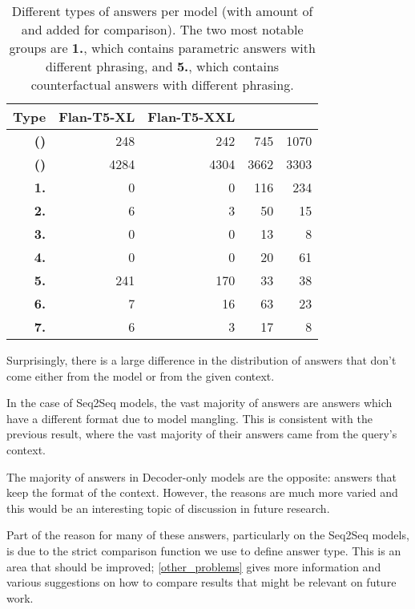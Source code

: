 \begin{table}[ht]
	\centering
	\footnotesize
	\begin{tabular}{>{\bfseries}r | r r r r}
		\toprule
			\bfseries Type & \ttfamily\scriptsize Flan-T5-XL & \ttfamily\scriptsize Flan-T5-XXL & \ttfamily\scriptsize \llamaparbox{} & \ttfamily\scriptsize \bigllamaparbox{} \\
		\midrule
			\tiny (\Parametric{}) & 248 & 242 & 745 & 1070 \\
			\tiny (\Contextual{}) & 4284 & 4304 & 3662 & 3303 \\
		\midrule
			1. & 0 & 0 & 116 & 234 \\
			2. & 6 & 3 & 50 & 15 \\
			3. & 0 & 0 & 13 & 8 \\
			4. & 0 & 0 & 20 & 61 \\
			5. & 241 & 170 & 33 & 38 \\
			6. & 7 & 16 & 63 & 23 \\
			7. & 6 & 3 & 17 & 8 \\
		\bottomrule
	\end{tabular}
	\caption{Different types of \Other{} answers per model (with amount of \Parametric{} and \Contextual{} added for comparison). The two most notable groups are \textbf{1.}, which contains parametric answers with different phrasing, and \textbf{5.}, which contains counterfactual answers with different phrasing.}
	\label{other_results_category}
\end{table}

Surprisingly, there is a large difference in the distribution of answers that don't come either from the model or from the given context.

In the case of Seq2Seq models, the vast majority of \Other{} answers are \Contextual{} answers which have a different format due to model mangling.
This is consistent with the previous result, where the vast majority of their answers came from the query's context.

The majority of \Other{} answers in Decoder-only models are the opposite: \Parametric{} answers that keep the format of the context.
However, the reasons are much more varied and this would be an interesting topic of discussion in future research.

Part of the reason for many of these answers, particularly on the Seq2Seq models, is due to the strict comparison function we use to define answer type.
This is an area that should be improved; \cref{other_problems} gives more information and various suggestions on how to compare results that might be relevant on future work.

